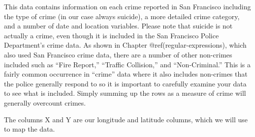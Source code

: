 \documentclass[
  a4paper,
]{krantz}
\begin{document}
This data contains information on each crime reported in San
Francisco including the type of crime (in our case always
suicide), a more detailed crime category, and a number of
date and location variables. Please note that suicide is not
actually a crime, even though it is included in the San
Francisco Police Department's crime data. As shown in
Chapter @ref(regular-expressions), which also used San
Francisco crime data, there are a number of other non-crimes
included such as ``Fire Report,'' ``Traffic Collision,'' and
``Non-Criminal.'' This is a fairly common occurrence in
``crime'' data where it also includes non-crimes that the
police generally respond to so it is important to carefully
examine your data to see what is included. Simply summing up
the rows as a measure of crime will generally overcount
crimes.

The columns X and Y are our longitude and latitude columns,
which we will use to map the data.
\end{document}

